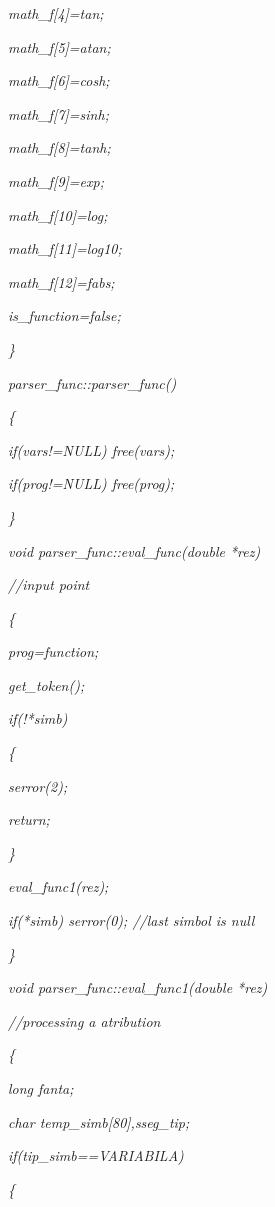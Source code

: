 \documentclass[a4paper,twoside]{book}
\begin{document}
\textit{\qquad math\_f[4]=tan;}

\textit{\qquad math\_f[5]=atan;}

\textit{\qquad math\_f[6]=cosh;}

\textit{\qquad math\_f[7]=sinh;}

\textit{\qquad math\_f[8]=tanh;}

\textit{\qquad math\_f[9]=exp;}

\textit{\qquad math\_f[10]=log;}

\textit{\qquad math\_f[11]=log10;}

\textit{\qquad math\_f[12]=fabs;}

\textit{\qquad is\_function=false;}

\textit{\}}

\textit{parser\_func::parser\_func()}

\textit{\{}

\textit{\qquad if(vars!=NULL) free(vars);}

\textit{\qquad if(prog!=NULL) free(prog);}

\textit{\}}

\textit{void parser\_func::eval\_func(double *rez)}

\textit{//input point}

\textit{\{}

\textit{\qquad prog=function;}

\textit{\qquad get\_token();}

\textit{\qquad if(!*simb)}

\textit{\qquad \{}

\textit{\qquad \qquad serror(2);}

\textit{\qquad \qquad return;}

\textit{\qquad \}}

\textit{\qquad eval\_func1(rez);}

\textit{\qquad if(*simb) serror(0); //last simbol is null}

\textit{\}}

\textit{void parser\_func::eval\_func1(double *rez)}

\textit{//processing a atribution}

\textit{\{}

\textit{\qquad long fanta;}

\textit{\qquad char temp\_simb[80],sseg\_tip;}

\textit{\qquad }

\textit{\qquad if(tip\_simb==VARIABILA)}

\textit{\qquad \{}
\end{document}
